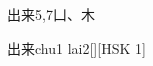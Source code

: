 \begin{entry}{出来}{5,7}{⼐、⽊}
  \begin{phonetics}{出来}{chu1 lai2}[][HSK 1]
  \end{phonetics}
\end{entry}
